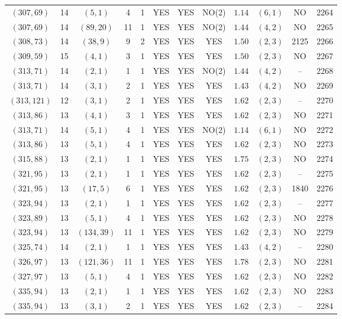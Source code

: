 \begin{longtable}{|c|c|c|c|c|c|c|c|c|c|c|c|}
$(307,69)$ & 14 & $(5,1)$ & 4 & 1 & YES & YES & NO(2) & $1.14$ & $(6,1)$ & NO & 2264\\
$(307,69)$ & 14 & $(89,20)$ & 11 & 1 & YES & YES & NO(2) & $1.44$ & $(4,2)$ & NO & 2265\\
$(308,73)$ & 14 & $(38,9)$ & 9 & 2 & YES & YES & YES & $1.50$ & $(2,3)$ & 2125 & 2266\\
$(309,59)$ & 15 & $(4,1)$ & 3 & 1 & YES & YES & YES & $1.50$ & $(2,3)$ & NO & 2267\\
$(313,71)$ & 14 & $(2,1)$ & 1 & 1 & YES & YES & NO(2) & $1.44$ & $(4,2)$ & -- & 2268\\
$(313,71)$ & 14 & $(3,1)$ & 2 & 1 & YES & YES & YES & $1.43$ & $(4,2)$ & NO & 2269\\
$(313,121)$ & 12 & $(3,1)$ & 2 & 1 & YES & YES & YES & $1.62$ & $(2,3)$ & -- & 2270\\
$(313,86)$ & 13 & $(4,1)$ & 3 & 1 & YES & YES & YES & $1.62$ & $(2,3)$ & NO & 2271\\
$(313,71)$ & 14 & $(5,1)$ & 4 & 1 & YES & YES & NO(2) & $1.14$ & $(6,1)$ & NO & 2272\\
$(313,86)$ & 13 & $(5,1)$ & 4 & 1 & YES & YES & YES & $1.62$ & $(2,3)$ & NO & 2273\\
$(315,88)$ & 13 & $(2,1)$ & 1 & 1 & YES & YES & YES & $1.75$ & $(2,3)$ & NO & 2274\\
$(321,95)$ & 13 & $(2,1)$ & 1 & 1 & YES & YES & YES & $1.62$ & $(2,3)$ & -- & 2275\\
$(321,95)$ & 13 & $(17,5)$ & 6 & 1 & YES & YES & YES & $1.62$ & $(2,3)$ & 1840 & 2276\\
$(323,94)$ & 13 & $(2,1)$ & 1 & 1 & YES & YES & YES & $1.62$ & $(2,3)$ & -- & 2277\\
$(323,89)$ & 13 & $(5,1)$ & 4 & 1 & YES & YES & YES & $1.62$ & $(2,3)$ & NO & 2278\\
$(323,94)$ & 13 & $(134,39)$ & 11 & 1 & YES & YES & YES & $1.62$ & $(2,3)$ & NO & 2279\\
$(325,74)$ & 14 & $(2,1)$ & 1 & 1 & YES & YES & YES & $1.43$ & $(4,2)$ & -- & 2280\\
$(326,97)$ & 13 & $(121,36)$ & 11 & 1 & YES & YES & YES & $1.78$ & $(2,3)$ & NO & 2281\\
$(327,97)$ & 13 & $(5,1)$ & 4 & 1 & YES & YES & YES & $1.62$ & $(2,3)$ & NO & 2282\\
$(335,94)$ & 13 & $(2,1)$ & 1 & 1 & YES & YES & YES & $1.62$ & $(2,3)$ & NO & 2283\\
$(335,94)$ & 13 & $(3,1)$ & 2 & 1 & YES & YES & YES & $1.62$ & $(2,3)$ & -- & 2284\\

\end{longtable}
